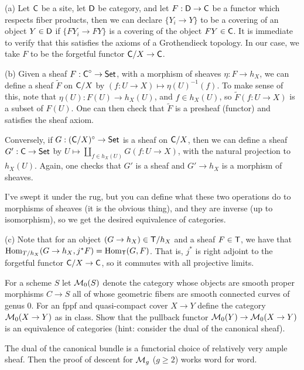 \begin{solution}
  (a) Let $\text{\sf C}$ be a site, let $\text{\sf D}$ be category, and let $F:\text{\sf D}\to \text{\sf C}$ be a functor which
  respects fiber products, then we can declare $\{Y_i\to Y\}$ to be a covering of an
  object $Y\in \text{\sf D}$ if $\{FY_i\to FY\}$ is a covering of the object $FY\in \text{\sf C}$. It is
  immediate to verify that this satisfies the axioms of a Grothendieck topology. In our
  case, we take $F$ to be the forgetful functor $\text{\sf C}/X\to \text{\sf C}$.

  (b) Given a sheaf $F:\text{\sf C}^\circ\to \text{\sf Set}$, with a morphism of sheaves $\eta:F\to h_X$, we
  can define a sheaf $\tilde F$ on $\text{\sf C}/X$ by $(f:U\to X)\mapsto \eta(U)^{-1}(f)$. To
  make sense of this, note that $\eta(U):F(U)\to h_X(U)$, and $f\in h_X(U)$, so $\tilde
  F(f:U\to X)$ is a subset of $F(U)$. One can then check that $\tilde F$ is a presheaf
  (functor) and satisfies the sheaf axiom.

  Conversely, if $G:(\text{\sf C}/X)^\circ\to \text{\sf Set}$ is a sheaf on $\text{\sf C}/X$, then we can define
  a sheaf $G':\text{\sf C}\to \text{\sf Set}$ by $U\mapsto \coprod_{f\in h_X(U)}G(f:U\to X)$, with the
  natural projection to $h_X(U)$. Again, one checks that $G'$ is a sheaf and $G'\to h_X$
  is a morphism of sheaves.

  I've swept it under the rug, but you can define what these two operations do to
  morphisms of sheaves (it is the obvious thing), and they are inverse (up to
  isomorphism), so we get the desired equivalence of categories.

  (c) Note that for an object
  $(G\to h_X)\in \text{\sf T}/h_X$ and a sheaf $F\in \text{\sf T}$, we have that $\operatorname{Hom}_{T/h_X}(G\to
  h_X,j^*F)=\operatorname{Hom}_{\text{\sf T}}(G,F)$. That is, $j^*$ is right adjoint to the forgetful functor
  $\text{\sf C}/X\to \text{\sf C}$, so it commutes with all projective limits.

\end{solution}

\begin{exercise}[3.1]
  For a scheme $S$ let $\mathcal{M}_0(S)$ denote the category whose objects are smooth proper
  morphisms $C\to S$ all of whose geometric fibers are smooth connected curves of genus
  0. For an fppf and quasi-compact cover $X\to Y$ define the category $\mathcal{M}_0(X\to Y)$ as
  in class. Show that the pullback functor $\mathcal{M}_0(Y)\to \mathcal{M}_0(X\to Y)$ is an equivalence
  of categories (hint: consider the dual of the canonical sheaf).
\end{exercise}
\begin{solution}
  The dual of the canonical bundle is a functorial choice of relatively very ample
  sheaf. Then the proof of descent for $\mathcal{M}_g$ ($g\ge 2$) works word for word.
\end{solution}

